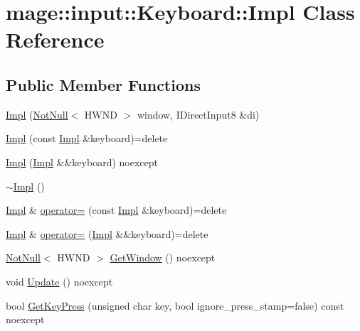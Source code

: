 \hypertarget{classmage_1_1input_1_1_keyboard_1_1_impl}{}\section{mage\+:\+:input\+:\+:Keyboard\+:\+:Impl Class Reference}
\label{classmage_1_1input_1_1_keyboard_1_1_impl}
\subsection*{Public Member Functions}
\begin{DoxyCompactItemize}
\item 
\hyperlink{classmage_1_1input_1_1_keyboard_1_1_impl_a07a7e889342075f32d2484e8f0a6006f}{Impl} (\hyperlink{namespacemage_a8769f9d670d6b585ea306cb1062af94b}{Not\+Null}$<$ H\+W\+ND $>$ window, I\+Direct\+Input8 \&di)
\item 
\hyperlink{classmage_1_1input_1_1_keyboard_1_1_impl_ac92f74e73ebe37b9ad539f196cb46876}{Impl} (const \hyperlink{classmage_1_1input_1_1_keyboard_1_1_impl}{Impl} \&keyboard)=delete
\item 
\hyperlink{classmage_1_1input_1_1_keyboard_1_1_impl_a97c9edb077833236e8c2f085d5ad02cc}{Impl} (\hyperlink{classmage_1_1input_1_1_keyboard_1_1_impl}{Impl} \&\&keyboard) noexcept
\item 
\hyperlink{classmage_1_1input_1_1_keyboard_1_1_impl_a928136f9bba9126b3cc861f05ec07675}{$\sim$\+Impl} ()
\item 
\hyperlink{classmage_1_1input_1_1_keyboard_1_1_impl}{Impl} \& \hyperlink{classmage_1_1input_1_1_keyboard_1_1_impl_adf6d3d47c39fbef1ee288aeeda5c55a0}{operator=} (const \hyperlink{classmage_1_1input_1_1_keyboard_1_1_impl}{Impl} \&keyboard)=delete
\item 
\hyperlink{classmage_1_1input_1_1_keyboard_1_1_impl}{Impl} \& \hyperlink{classmage_1_1input_1_1_keyboard_1_1_impl_adb53a165dcaf0e28ea51a64f40dcd482}{operator=} (\hyperlink{classmage_1_1input_1_1_keyboard_1_1_impl}{Impl} \&\&keyboard)=delete
\item 
\hyperlink{namespacemage_a8769f9d670d6b585ea306cb1062af94b}{Not\+Null}$<$ H\+W\+ND $>$ \hyperlink{classmage_1_1input_1_1_keyboard_1_1_impl_a7f27872bdc2f1bfbe87ee4de083597d5}{Get\+Window} () noexcept
\item 
void \hyperlink{classmage_1_1input_1_1_keyboard_1_1_impl_a94276b53e2160e2d191c405f858a76ba}{Update} () noexcept
\item 
bool \hyperlink{classmage_1_1input_1_1_keyboard_1_1_impl_a61f6709d4877d7e6b6a6820814dc6ccf}{Get\+Key\+Press} (unsigned char key, bool ignore\+\_\+press\+\_\+stamp=false) const noexcept
\end{DoxyCompactItemize}

